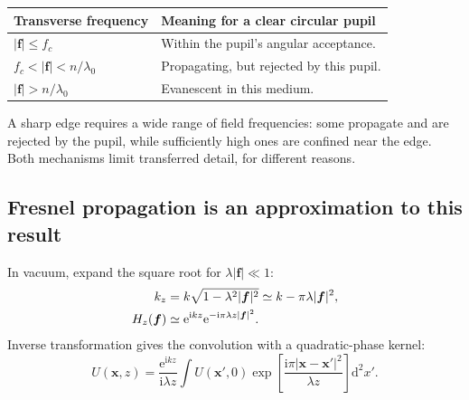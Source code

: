 \documentclass[11pt,a4paper]{article}
\numberwithin{equation}{section}
\newcommand{\dd}{\mathrm{d}}
\newcommand{\ii}{\mathrm{i}}
\newcommand{\ee}{\mathrm{e}}
\newcommand{\vct}[1]{\bm{#1}}
\begin{document}
\begin{center}
\small
\begin{tabularx}{\textwidth}{@{}lY@{}}
\toprule Transverse frequency & Meaning for a clear circular pupil\\\midrule
$|\vct f|\leq f_c$ & Within the pupil's angular acceptance.\\
$f_c<|\vct f|<n/\lambda_0$ & Propagating, but rejected by this pupil.\\
$|\vct f|>n/\lambda_0$ & Evanescent in this medium.\\\bottomrule
\end{tabularx}
\end{center}
A sharp edge requires a wide range of field frequencies: some propagate
and are rejected by the pupil, while sufficiently high ones are confined
near the edge. Both mechanisms limit transferred detail, for different reasons.

\subsection{Fresnel propagation is an approximation to this result}
In vacuum, expand the square root for $\lambda|\vct f|\ll1$:
\begin{align}
k_z&=k\sqrt{1-\lambda^2|\vct f|^2}
\simeq k-\pi\lambda|\vct f|^2,\notag\\
H_z(\vct f)&\simeq\ee^{\ii kz}\ee^{-\ii\pi\lambda z|\vct f|^2}.
\label{eq:fresnel-transfer}
\end{align}
Inverse transformation gives the convolution with a quadratic-phase kernel:
\begin{equation}
\boxed{U(\vct x,z)=\frac{\ee^{\ii kz}}{\ii\lambda z}
\int U(\vct x',0)
\exp\!\left[\frac{\ii\pi|\vct x-\vct x'|^2}{\lambda z}\right]\dd^2x'.}
\label{eq:fresnel}
\end{equation}
\end{document}
